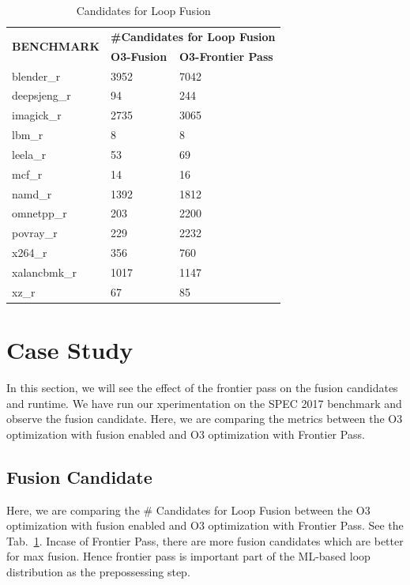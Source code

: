 \begin{table}[h]
\begin{tabular}{|l|l|l|}
\hline
\multirow{2}{*}{\textbf{BENCHMARK}} & \multicolumn{2}{c|}{\textbf{\#Candidates for Loop Fusion}} \\ \cline{2-3} 
 & \textbf{O3-Fusion} & \textbf{O3-Frontier Pass} \\ \hline
blender\_r & 3952 & 7042 \\ \hline
deepsjeng\_r & 94 & 244 \\ \hline
imagick\_r & 2735 & 3065 \\ \hline
lbm\_r & 8 & 8 \\ \hline
leela\_r & 53 & 69 \\ \hline
mcf\_r & 14 & 16 \\ \hline
namd\_r & 1392 & 1812 \\ \hline
omnetpp\_r & 203 & 2200 \\ \hline
povray\_r & 229 & 2232 \\ \hline
x264\_r & 356 & 760 \\ \hline
xalancbmk\_r & 1017 & 1147 \\ \hline
xz\_r & 67 & 85 \\ \hline
\end{tabular}
\centering
\caption{Candidates for Loop Fusion}
\label{tab:dist:fuscand}
\end{table}

\section{Case Study}\label{sec:distribution:case}
In this section, we will see the effect of the frontier pass on the fusion candidates and runtime. We have run our xperimentation on the SPEC 2017 benchmark and  observe the fusion candidate. Here, we are comparing the metrics between the O3 optimization with fusion enabled and O3 optimization with Frontier Pass.

\subsection{Fusion Candidate}
Here, we are comparing the \# Candidates for Loop Fusion between the O3 optimization with fusion enabled and O3 optimization with Frontier Pass. See the Tab.~\ref{tab:dist:fuscand}. Incase of Frontier Pass, there are more fusion candidates which are better for max fusion. Hence frontier pass is important part of the ML-based loop distribution as the prepossessing step. 

